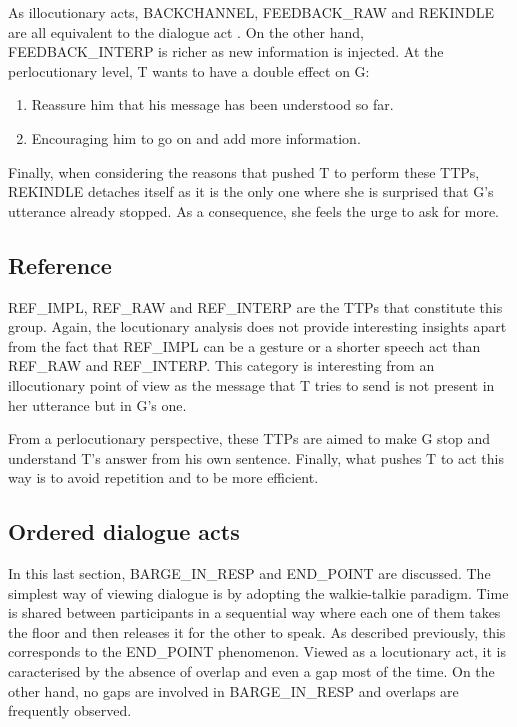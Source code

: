 					As illocutionary acts, BACKCHANNEL, FEEDBACK\_RAW and REKINDLE are all equivalent to the dialogue act \cite{I understand what you said so far, please continue}. On the other hand, FEEDBACK\_INTERP is richer as new information is injected. At the perlocutionary level, T wants to have a double effect on G:
					\begin{enumerate}
						\item Reassure him that his message has been understood so far.
						\item Encouraging him to go on and add more information.
					\end{enumerate}
					
					Finally, when considering the reasons that pushed T to perform these TTPs, REKINDLE detaches itself as it is the only one where she is surprised that G's utterance already stopped. As a consequence, she feels the urge to ask for more.

    \subsection{Reference}
		
					REF\_IMPL, REF\_RAW and REF\_INTERP are the TTPs that constitute this group. Again, the locutionary analysis does not provide interesting insights apart from the fact that REF\_IMPL can be a gesture or a shorter speech act than REF\_RAW and REF\_INTERP. This category is interesting from an illocutionary point of view as the message that T tries to send is not present in her utterance but in G's one.
					
					From a perlocutionary perspective, these TTPs are aimed to make G stop and understand T's answer from his own sentence. Finally, what pushes T to act this way is to avoid repetition and to be more efficient.

    \subsection{Ordered dialogue acts}

         In this last section, BARGE\_IN\_RESP and END\_POINT are discussed. The simplest way of viewing dialogue is by adopting the walkie-talkie paradigm. Time is shared between participants in a sequential way where each one of them takes the floor and then releases it for the other to speak. As described previously, this corresponds to the END\_POINT phenomenon. Viewed as a locutionary act, it is caracterised by the absence of overlap and even a gap most of the time. On the other hand, no gaps are involved in BARGE\_IN\_RESP and overlaps are frequently observed.

